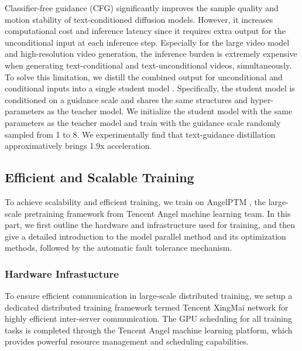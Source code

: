 Classifier-free guidance (CFG) \cite{ho2022classifier} significantly improves the sample quality and motion stability of text-conditioned diffusion models.
However, it increases computational cost and inference latency since it requires extra output for the unconditional input at each inference step.
Especially for the large video model and high-resolution video generation, the inference burden is extremely expensive when generating text-conditional and text-unconditional videos, simultaneously.
To solve this limitation, we distill the combined output for unconditional and conditional inputs into a single student model \cite{meng2023distillation}.
Specifically, the student model is conditioned on a guidance scale and shares the same structures and hyper-parameters as the teacher model.
We initialize the student model with the same parameters as the teacher model and train with the guidance scale randomly sampled from 1 to 8. We experimentally find that text-guidance distillation approximatively brings 1.9x acceleration. 

\subsection{Efficient and Scalable Training}

To achieve scalability and efficient training, 
we train \nameofmethod{} on AngelPTM \cite{nie2023angel}, 
the large-scale pretraining framework from Tencent Angel machine learning team.
In this part, we first outline the hardware and infrastructure used for training, and then give a detailed introduction to the model parallel method and its optimization methods, followed by the automatic fault tolerance mechanism.

\subsubsection{Hardware Infrastucture}
To ensure efficient communication in large-scale distributed training, we setup a dedicated distributed training framework termed Tencent XingMai network \cite{2024tccl} for highly efficient inter-server communication. 
The GPU scheduling for all training tasks is completed through the Tencent Angel machine learning platform, which provides powerful resource management and scheduling capabilities.


